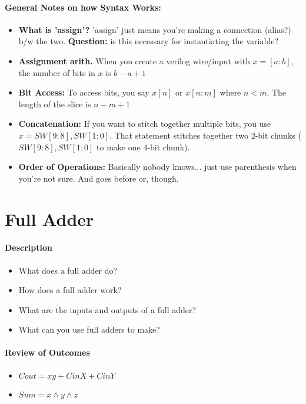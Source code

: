 \documentclass[a4paper,12pt]{report}
\begin{document}
\paragraph{General Notes on how Syntax Works:}
\begin{itemize}
\item \textbf{What is 'assign'? } 'assign' just means you're making a connection (alias?) b/w the
two. \textbf{Question: } is this necessary for instantiating the variable?
\item \textbf{Assignment arith.} When you create a verilog wire/input with $x = [a:b]$, the number of bits in 
$x$ is $b-a + 1$
\item \textbf{Bit Access: } To access bits, you say $x[n]$ or $x[n:m]$ where $n < m$. The length of the slice
is $n-m +1$
\item \textbf{Concatenation: } If you want to stitch together multiple bits, you use $x = {SW[9:8], SW[1:0]}$. That
statement stitches together two 2-bit chunks ($SW[9:8], SW[1:0]$ to make one 4-bit chunk).
\item \textbf{Order of Operations: } Basically nobody knows... just use parenthesis when you're
not sure. And goes before or, though.
\end{itemize}


\section{Full Adder}
\paragraph{Description}
\begin{itemize}
\item What does a full adder do?
\item How does a full adder work?
\item What are the inputs and outputs of a full adder?
\item What can you use full adders to make?
\end{itemize}

\paragraph{Review of Outcomes}
\begin{itemize}
\item $Cout = xy + CinX + CinY$
\item $Sum = x \wedge y \wedge z$
\end{itemize}
\end{document}
